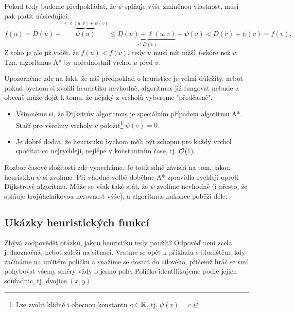 Pokud tedy budeme předpokládat, že $\psi$ splňuje výše zmíněnou vlastnost, musí pak platit následující:
\[f(u)=D(u)+\overbrace{\psi(u)}^{\leqslant\ell(u,v)+\psi(v)}\leqslant \underbrace{D(u)+\ell(u,v)}_{<D(v)}+\psi(v)<D(v)+\psi(v)=f(v).\]
Z toho je ale již vidět, že $f(u)<f(v)$, tedy $u$ musí mít nižší $f$-skóre než $v$. Tzn. algoritmus A* by upřednostnil vrchol $u$ před $v$.

Upozorněme zde na fakt, že náš předpoklad o heuristice je velmi důležitý, neboť pokud bychom si zvolili heuristiku nevhodně, algoritmus již fungovat nebude a obecně může dojít k tomu, že nějaký z vrcholů vybereme "předčasně".

\begin{remark}
    \begin{itemize}
        \item Všimněme si, že Dijkstrův algoritmus je speciálním případem algoritmu A*. Stačí pro všechny vrcholy $v$ položit\footnote{Lze zvolit klidně i obecnou konstantu $c\in\mathbb{R}$, tj. $\psi(v)=c$.} $\psi(v)=0$.
        \item Je dobré dodat, že heuristiku bychom měli být schopni pro každý vrchol spočítat co nejrychleji, nejlépe v konstantním čase, tj. $\mathcal{O}(1)$.
    \end{itemize}
\end{remark}

Rozbor časové složitosti zde vynecháme. Je totiž silně závislá na tom, jakou heuristiku $\psi$ si zvolíme. Při vhodné volbě doběhne A* zpravidla rychleji oproti Dijkstrově algoritmu. Může se však také stát, že $\psi$ zvolíme nevhodně (i přesto, že splňuje trojúhelníkovou nerovnost výše), a algoritmus nakonec poběží déle.

\subsection{Ukázky heuristických funkcí}

Zbývá zodpovědět otázku, jakou heuristiku tedy použít? Odpověď není zcela jednoznačná, neboť záleží na situaci. Vraťme se opět k příkladu s bludištěm, kdy začínáme na určitém políčku a snažíme se dostat do cílového, přičemž hráč se smí pohybovat všemy směry vždy o jedno pole. Políčka identifikujeme podle jejich souřadnic, tj. dvojice $(x,y)$.


